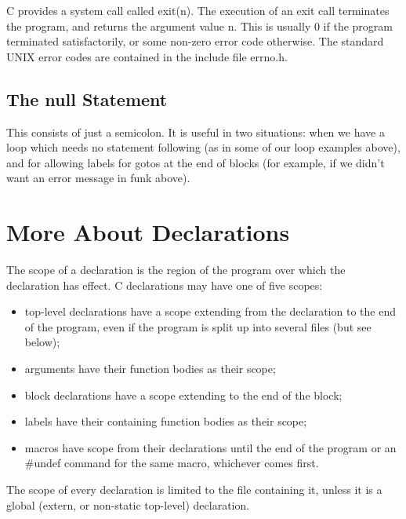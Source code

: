 C provides  a system  call called  
{\cd exit({\ms n\/})}.  The
execution of an {\cd exit} call terminates the program, and returns
the argument value {\ms n\/}. This is usually 0 if the program
terminated satisfactorily, or some non-zero error code otherwise. The standard
UNIX error codes are contained in the include file {\fn errno.h}. 

\subsection{The null Statement}
     This consists  of just  a semicolon. It is useful in two
situations: when we have  a loop  which needs  no {\ms statement\/}
following (as in some of our loop examples above),  and for  allowing
labels for {\cd goto}s at the end of blocks (for example, if we
didn't want an error message in {\cd funk} above).



\section{More About Declarations}
     The {\kc scope\/}  of a  declaration is  the region of the program
over which the declaration has effect. C declarations may have one of
five scopes:
\begin{itemize}
 \item {\kc top-level declarations\/} have a scope extending from the
declaration to the end of  the program, even if the program is split
up into several files (but see below);

\item {\kc arguments\/} have their function bodies as their scope;

\item {\kc block declarations\/} have a scope extending to the end of
the block;

\item {\kc labels\/} have their containing function bodies as their
scope;

\item {\kc macros\/} have scope from their declarations until the end
of the program or an {\cd \#undef} command for the same macro,
whichever comes first.

\end{itemize}
      The scope  of every  declaration is  limited to  the  file
containing it, unless it is a global ({\cd extern}, or non-static
top-level) declaration.


